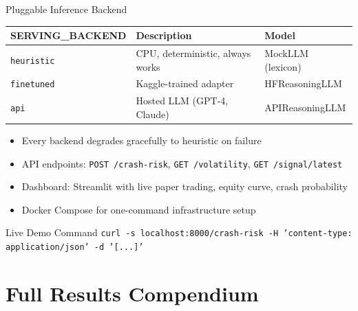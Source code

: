\documentclass[10pt,aspectratio=169]{beamer}
\begin{document}
\begin{frame}{Pluggable Inference Backend}
  \begin{table}
    \centering
    \begin{tabular}{lp{5cm}l}
      \toprule
      \textbf{SERVING\_BACKEND} & \textbf{Description} & \textbf{Model} \\
      \midrule
      \texttt{heuristic} & CPU, deterministic, always works & MockLLM (lexicon) \\
      \texttt{finetuned} & Kaggle-trained adapter & HFReasoningLLM \\
      \texttt{api} & Hosted LLM (GPT-4, Claude) & APIReasoningLLM \\
      \bottomrule
    \end{tabular}
  \end{table}
  
  \begin{itemize}
    \item Every backend degrades gracefully to heuristic on failure
    \item API endpoints: \texttt{POST /crash-risk}, \texttt{GET /volatility}, \texttt{GET /signal/latest}
    \item Dashboard: Streamlit with live paper trading, equity curve, crash probability
    \item Docker Compose for one-command infrastructure setup
  \end{itemize}
  
  \begin{exampleblock}{Live Demo Command}
    \texttt{curl -s localhost:8000/crash-risk -H 'content-type: application/json' -d '[...]'}
  \end{exampleblock}
\end{frame}

\section{Full Results Compendium}
\end{document}
